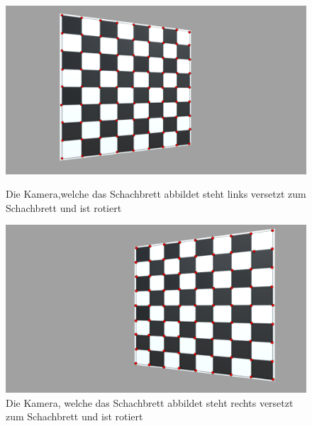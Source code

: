

\begin{figure}[!htb]
	\includegraphics[width=\linewidth]{images/ChessBoardLeft.png}
	\caption[Korrespondezsuche mit Sortierungsalgorithmus. Schachbrett auf linker Seite]{Die Kamera,welche das Schachbrett abbildet steht links versetzt zum Schachbrett und ist rotiert}
	\label{fig:ChessBoardLeft}
	\endminipage\hfill
	\includegraphics[width=\linewidth]{images/ChessBoardRight.png}
	\caption[Korrespondezsuche mit Sortierungsalgorithmus. Schachbrett auf rechter Seite]{Die Kamera, welche das Schachbrett abbildet steht rechts versetzt zum Schachbrett und ist rotiert}
	\label{fig:ChessBoardRight}
	\endminipage\hfill
\end{figure}


